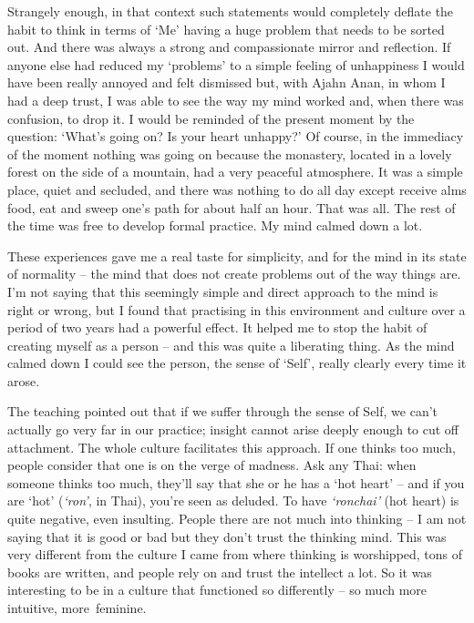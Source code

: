 Strangely enough, in that context such statements would completely deflate the habit to think in terms of `Me' having a huge problem that needs to be sorted out. And there was always a strong and compassionate mirror and reflection. If anyone else had reduced my `problems' to a simple feeling of unhappiness I would have been really annoyed and felt dismissed but, with Ajahn Anan, in whom I had a deep trust, I was able to see the way my mind worked and, when there was confusion, to drop it. I would be reminded of the present moment by the question: `What's going on? Is your heart unhappy?' Of course, in the immediacy of the moment nothing was going on because the monastery, located in a lovely forest on the side of a mountain, had a very peaceful atmosphere. It was a simple place, quiet and secluded, and there was nothing to do all day except receive alms food, eat and sweep one's path for about half an hour. That was all. The rest of the time was free to develop formal practice. My mind calmed down a lot.

These experiences gave me a real taste for simplicity, and for the mind in its state of normality -- the mind that does not create problems out of the way things are. I'm not saying that this seemingly simple and direct approach to the mind is right or wrong, but I found that practising in this environment and culture over a period of two years had a powerful effect. It helped me to stop the habit of creating myself as a person -- and this was quite a liberating thing. As the mind calmed down I could see the person, the sense of `Self', really clearly every time it arose.

The teaching pointed out that if we suffer through the sense of Self, we can't actually go very far in our practice; insight cannot arise deeply enough to cut off attachment. The whole culture facilitates this approach. If one thinks too much, people consider that one is on the verge of madness. Ask any Thai: when someone thinks too much, they'll say that she or he has a `hot heart' -- and if you are `hot' (\textit{`ron'}, in Thai), you're seen as deluded. To have \textit{`ronchai'} (hot heart) is quite negative, even insulting. People there are not much into thinking -- I am not saying that it is good or bad but they don't trust the thinking mind. This was very different from the culture I came from where thinking is worshipped, tons of books are written, and people rely on and trust the intellect a lot. So it was interesting to be in a culture that functioned so differently -- so much more intuitive, \mbox{more feminine.}

